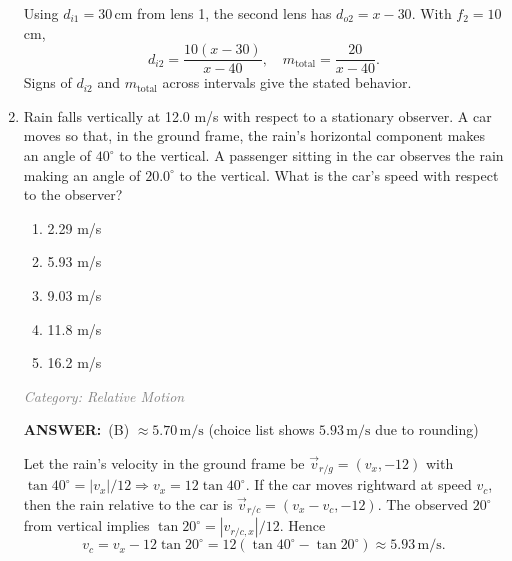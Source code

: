 \documentclass[12pt, a4paper]{article}
\makeatletter
\newcommand{\finalanswer}[1]{\textbf{ANSWER:}~#1}
\newif\if@categoryprinted
\newcommand{\category}[1]{\if@categoryprinted\relax\else\textit{\textcolor{gray}{Category: #1}}\global\@categoryprintedtrue\fi}
\makeatother
\begin{document}
\begin{CJK*}{UTF8}{gbsn}
\begin{enumerate}[itemsep=1.0em, topsep=0.6em]
\begin{solutionbox}
Using $d_{i1}=30\,\text{cm}$ from lens 1, the second lens has $d_{o2}=x-30$. With $f_2=10$ cm,
\[ d_{i2}=\frac{10(x-30)}{x-40}, \quad m_{\text{total}}=\frac{20}{x-40}. \]
Signs of $d_{i2}$ and $m_{\text{total}}$ across intervals give the stated behavior.
\end{solutionbox}

\item \label{prob:26}
Rain falls vertically at 12.0 m/s with respect to a stationary observer. A car moves so that, in the ground frame, the rain's horizontal component makes an angle of $40^\circ$ to the vertical. A passenger sitting in the car observes the rain making an angle of $20.0^\circ$ to the vertical. What is the car's speed with respect to the observer?
\begin{enumerate}[label=(\Alph*)]
    \item 2.29 m/s
    \item 5.93 m/s
    \item 9.03 m/s
    \item 11.8 m/s
    \item 16.2 m/s
\end{enumerate}

\category{Relative Motion}
\begin{answerbox}
\finalanswer{(B) $\approx 5.70\,\text{m/s}$ (choice list shows $5.93\,\text{m/s}$ due to rounding)}
\end{answerbox}
\begin{solutionbox}

Let the rain’s velocity in the ground frame be $\vec v_{r/g}=(v_x,-12)$ with $\tan 40^\circ=|v_x|/12 \Rightarrow v_x=12\tan 40^\circ$. If the car moves rightward at speed $v_c$, then the rain relative to the car is $\vec v_{r/c}=(v_x-v_c,-12)$. The observed $20^\circ$ from vertical implies $\tan 20^\circ=|v_{r/c,x}|/12$. Hence
\[
v_c=v_x-12\tan 20^\circ=12(\tan 40^\circ-\tan 20^\circ)\approx5.93\,\text{m/s}.
\]
\end{solutionbox}

\newpage


\end{enumerate}
\end{CJK*}
\end{document}
